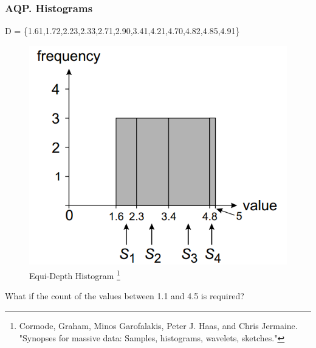 \documentclass{beamer}
\begin{document}
\begin{frame}
\frametitle{AQP. Histograms}
\fontsize{10}{5}\selectfont D = \{1.61,1.72,2.23,2.33,2.71,2.90,3.41,4.21,4.70,4.82,4.85,4.91\}
\begin{figure}
  \centering
  \includegraphics[scale=0.3]{img/Blinktopus-EquiDepth.png}
  \caption{Equi-Depth Histogram \footnote{\fontsize{3}{5}\selectfont Cormode, Graham, Minos Garofalakis, Peter J. Haas, and Chris Jermaine. "Synopses for massive data: Samples, histograms, wavelets, sketches."}}
\end{figure}
What if the count of the values between 1.1 and 4.5 is required?
\end{frame}
\end{document}
